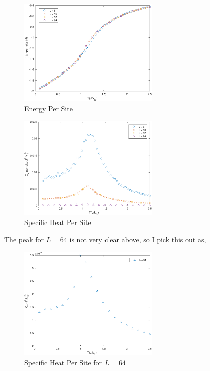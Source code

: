 \documentclass[a4paper]{article}
\begin{document}
\begin{figure}[H]
\centering
\includegraphics[width = 0.6\textwidth]{../Flux-Data/E_T-crop.pdf}
\caption{Energy Per Site}
\end{figure}

\begin{figure}[H]
\centering
\includegraphics[width = 0.6\textwidth]{../Flux-Data/CV_T-crop.pdf}
\caption{Specific Heat Per Site}
\end{figure}

The peak for $L = 64$ is not very clear above, so I pick this out as,

\begin{figure}[H]
\centering
\includegraphics[width = 0.6\textwidth]{../Flux-Data/CV_T_64-crop.pdf}
\caption{Specific Heat Per Site for $L = 64$}
\end{figure}
\end{document}
